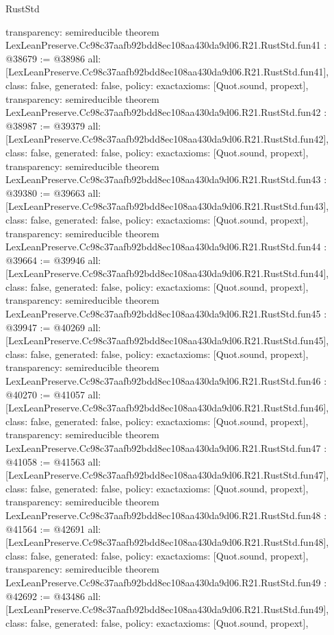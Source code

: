 \begin{lexlean}{RustStd}
\begin{coremodule}
{  transparency: semireducible
}
theorem LexLeanPreserve.Cc98c37aafb92bdd8ec108aa430da9d06.R21.RustStd.fun41 : @38679 := @38986 {
  all: [LexLeanPreserve.Cc98c37aafb92bdd8ec108aa430da9d06.R21.RustStd.fun41],
  class: false,
  generated: false,
  policy: exact{axioms: [Quot.sound, propext]},
  transparency: semireducible
}
theorem LexLeanPreserve.Cc98c37aafb92bdd8ec108aa430da9d06.R21.RustStd.fun42 : @38987 := @39379 {
  all: [LexLeanPreserve.Cc98c37aafb92bdd8ec108aa430da9d06.R21.RustStd.fun42],
  class: false,
  generated: false,
  policy: exact{axioms: [Quot.sound, propext]},
  transparency: semireducible
}
theorem LexLeanPreserve.Cc98c37aafb92bdd8ec108aa430da9d06.R21.RustStd.fun43 : @39380 := @39663 {
  all: [LexLeanPreserve.Cc98c37aafb92bdd8ec108aa430da9d06.R21.RustStd.fun43],
  class: false,
  generated: false,
  policy: exact{axioms: [Quot.sound, propext]},
  transparency: semireducible
}
theorem LexLeanPreserve.Cc98c37aafb92bdd8ec108aa430da9d06.R21.RustStd.fun44 : @39664 := @39946 {
  all: [LexLeanPreserve.Cc98c37aafb92bdd8ec108aa430da9d06.R21.RustStd.fun44],
  class: false,
  generated: false,
  policy: exact{axioms: [Quot.sound, propext]},
  transparency: semireducible
}
theorem LexLeanPreserve.Cc98c37aafb92bdd8ec108aa430da9d06.R21.RustStd.fun45 : @39947 := @40269 {
  all: [LexLeanPreserve.Cc98c37aafb92bdd8ec108aa430da9d06.R21.RustStd.fun45],
  class: false,
  generated: false,
  policy: exact{axioms: [Quot.sound, propext]},
  transparency: semireducible
}
theorem LexLeanPreserve.Cc98c37aafb92bdd8ec108aa430da9d06.R21.RustStd.fun46 : @40270 := @41057 {
  all: [LexLeanPreserve.Cc98c37aafb92bdd8ec108aa430da9d06.R21.RustStd.fun46],
  class: false,
  generated: false,
  policy: exact{axioms: [Quot.sound, propext]},
  transparency: semireducible
}
theorem LexLeanPreserve.Cc98c37aafb92bdd8ec108aa430da9d06.R21.RustStd.fun47 : @41058 := @41563 {
  all: [LexLeanPreserve.Cc98c37aafb92bdd8ec108aa430da9d06.R21.RustStd.fun47],
  class: false,
  generated: false,
  policy: exact{axioms: [Quot.sound, propext]},
  transparency: semireducible
}
theorem LexLeanPreserve.Cc98c37aafb92bdd8ec108aa430da9d06.R21.RustStd.fun48 : @41564 := @42691 {
  all: [LexLeanPreserve.Cc98c37aafb92bdd8ec108aa430da9d06.R21.RustStd.fun48],
  class: false,
  generated: false,
  policy: exact{axioms: [Quot.sound, propext]},
  transparency: semireducible
}
theorem LexLeanPreserve.Cc98c37aafb92bdd8ec108aa430da9d06.R21.RustStd.fun49 : @42692 := @43486 {
  all: [LexLeanPreserve.Cc98c37aafb92bdd8ec108aa430da9d06.R21.RustStd.fun49],
  class: false,
  generated: false,
  policy: exact{axioms: [Quot.sound, propext]},
}
\end{coremodule}
\end{lexlean}
